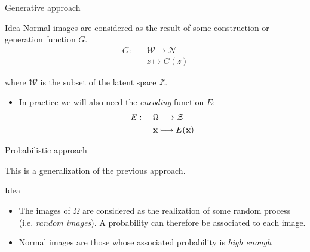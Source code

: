 \documentclass[xcolor=pdftex,dvipsnames,table,mathserif]{beamer}
\begin{document}
\begin{frame}{Generative approach}

  \begin{block}{Idea}
    Normal images are considered as the result of some construction or generation function $G$.
    \[
    \begin{split}
    G: & ~~~~\mathcal{W} \longrightarrow \mathcal{N} \\
    & ~~~~ z \longmapsto G(z)
    \end{split}
    \]

    where $\mathcal{W}$ is the subset of the latent space $\mathcal{Z}$.
  \end{block}

\begin{itemize}
\item In practice we will also need the \emph{encoding} function $E$:
    \[
    \begin{split}
    E: & ~~~~\Omega \longrightarrow \mathcal{Z} \\
    & ~~~~ \mathbf{x} \longmapsto E(\mathbf{x})
    \end{split}
    \]

\end{itemize}

\end{frame}


\begin{frame}{Probabilistic approach}

This is a generalization of the previous approach.

\begin{block}{Idea}

  \begin{itemize}
  \item   The images of $\Omega$ are considered as the realization of some random process (i.e. \emph{random images}). A probability can therefore be associated to each image.
  \item Normal images are those whose associated probability is \emph{high enough}
  \end{itemize}

\end{block}



\end{frame}
\end{document}
